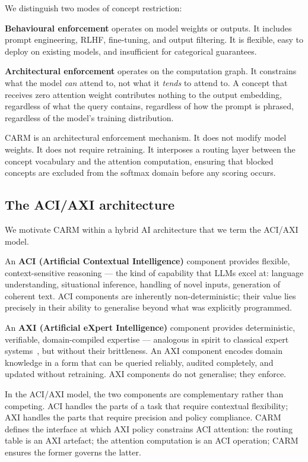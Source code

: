 \documentclass[11pt,a4paper]{article}
\theoremstyle{definition}
\begin{document}
We distinguish two modes of concept restriction:

\textbf{Behavioural enforcement} operates on model weights or outputs. It includes
prompt engineering, RLHF, fine-tuning, and output filtering. It is flexible, easy
to deploy on existing models, and insufficient for categorical guarantees.

\textbf{Architectural enforcement} operates on the computation graph. It constrains
what the model \emph{can} attend to, not what it \emph{tends} to attend to. A
concept that receives zero attention weight contributes nothing to the output
embedding, regardless of what the query contains, regardless of how the prompt is
phrased, regardless of the model's training distribution.

CARM is an architectural enforcement mechanism. It does not modify model weights. It
does not require retraining. It interposes a routing layer between the concept
vocabulary and the attention computation, ensuring that blocked concepts are excluded
from the softmax domain before any scoring occurs.

\subsection{The ACI/AXI architecture}
\label{sec:aciaxiintro}

We motivate CARM within a hybrid AI architecture that we term the ACI/AXI model.

An \textbf{ACI (Artificial Contextual Intelligence)} component provides flexible,
context-sensitive reasoning --- the kind of capability that LLMs excel at: language
understanding, situational inference, handling of novel inputs, generation of
coherent text. ACI components are inherently non-deterministic; their value lies
precisely in their ability to generalise beyond what was explicitly programmed.

An \textbf{AXI (Artificial eXpert Intelligence)} component provides deterministic,
verifiable, domain-compiled expertise --- analogous in spirit to classical expert
systems~\cite{Jackson1986}, but without their brittleness. An AXI component encodes
domain knowledge in a form that can be queried reliably, audited completely, and
updated without retraining. AXI components do not generalise; they enforce.

In the ACI/AXI model, the two components are complementary rather than competing.
ACI handles the parts of a task that require contextual flexibility; AXI handles the
parts that require precision and policy compliance. CARM defines the interface at
which AXI policy constrains ACI attention: the routing table is an AXI artefact; the
attention computation is an ACI operation; CARM ensures the former governs the
latter.
\end{document}
